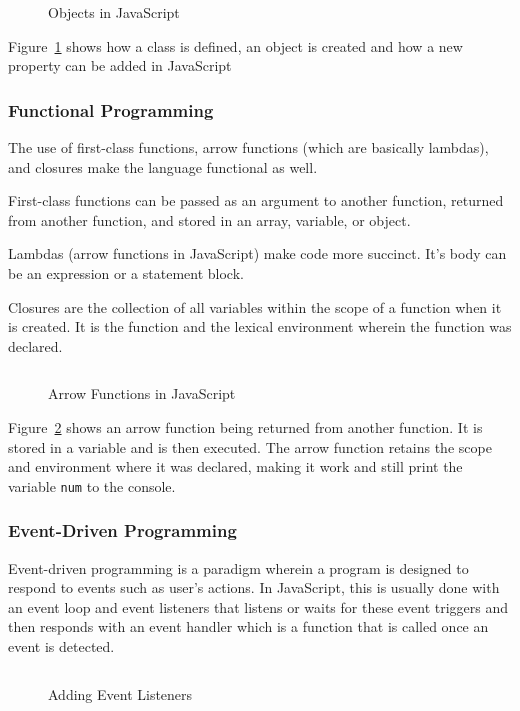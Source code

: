 \documentclass{article}
\newcommand{\js}[1]{\inputminted{javascript}{samples/js/#1.js}}
\newcommand{\jsin}[1]{\texttt{#1}}
\begin{document}
  \begin{figure}[ht]
    \js{oop}
    \caption{Objects in JavaScript}
    \label{fig:oop}
  \end{figure}

  Figure~\ref{fig:oop} shows how a class is defined, an object is created and
  how a new property can be added in JavaScript

  \subsubsection{Functional Programming}
  The use of first-class functions, arrow functions (which are basically
  lambdas), and closures make the language functional as well.

  First-class functions can be passed as an argument to another function,
  returned from another function, and stored in an array, variable, or object.

  Lambdas (arrow functions in JavaScript) make code more succinct. It’s body can
  be an expression or a statement block.

  Closures are the collection of all variables within the scope of a function
  when it is created. It is the function and the lexical environment wherein the
  function was declared.

  \begin{figure}[ht]
    \js{arrow}
    \caption{Arrow Functions in JavaScript}
    \label{fig:arrow}
  \end{figure}

  Figure~\ref{fig:arrow} shows an arrow function being returned from another
  function. It is stored in a variable and is then executed. The arrow function
  retains the scope and environment where it was declared, making it work and
  still print the variable \jsin{num} to the console.

  \subsubsection{Event-Driven Programming}
  Event-driven programming is a paradigm wherein a program is designed to
  respond to events such as user’s actions. In JavaScript, this is usually done
  with an event loop and event listeners that listens or waits for these event
  triggers and then responds with an event handler which is a function that is
  called once an event is detected.

  \begin{figure}[ht]
    \js{events}
    \caption{Adding Event Listeners}
    \label{fig:events}
  \end{figure}
\end{document}
